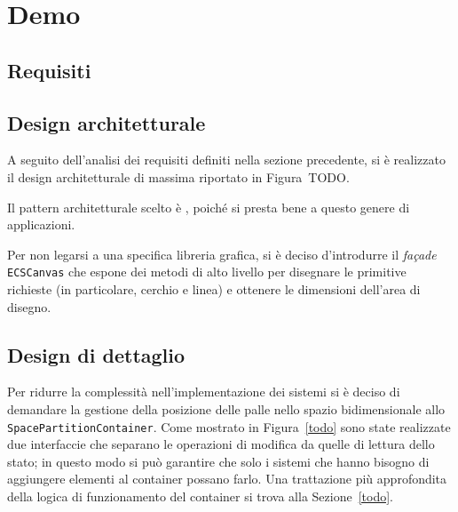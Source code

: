 \chapter{Demo}\label{ch:demo}

\section{Requisiti}\label{sec:demo-requisiti}

\section{Design architetturale}\label{sec:demo-design-architetturale}
A seguito dell'analisi dei requisiti definiti nella sezione precedente, si è realizzato il design architetturale di
massima riportato in Figura~TODO.

Il pattern architetturale scelto è \ECS, poiché si presta bene a questo genere di applicazioni.

Per non legarsi a una specifica libreria grafica, si è deciso d'introdurre il \textit{façade} \texttt{ECSCanvas}
che espone dei metodi di alto livello per disegnare le primitive richieste (in particolare, cerchio e linea) e ottenere
le dimensioni dell'area di disegno.

\section{Design di dettaglio}\label{sec:demo-design-di-dettaglio}
Per ridurre la complessità nell'implementazione dei sistemi si è deciso di demandare la gestione della posizione delle
palle nello spazio bidimensionale allo \texttt{SpacePartitionContainer}.
Come mostrato in Figura~\ref{todo} sono state realizzate due interfaccie che separano le operazioni di modifica da
quelle di lettura dello stato;
in questo modo si può garantire che solo i sistemi che hanno bisogno di aggiungere elementi al container possano farlo.
Una trattazione più approfondita della logica di funzionamento del container si trova alla Sezione~\ref{todo}.

